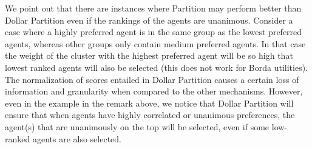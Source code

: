 \documentclass[letterpaper]{article}
\newtheorem{theorem}{Theorem}
\newcommand{\qed}{\unskip\hspace*{1em}\hspace{\fill}$\Box$}
\newenvironment{proof}[1][Proof]{\begin{trivlist}
 \item[\hskip \labelsep {\it #1:}]}{%
 \qed\end{trivlist}}
\DeclarePairedDelimiter{\ceil}{\lceil}{\rceil}
\DeclarePairedDelimiter{\floor}{\lfloor}{\rfloor}
\begin{document}
We point out that there are instances where Partition may perform better than Dollar Partition even if the rankings of the agents are unanimous. Consider a case where a highly preferred agent is in the same group as the lowest preferred agents, whereas other groups only contain medium preferred agents. In that case the weight of the cluster with the highest preferred agent will be so high that lowest ranked agents will also be selected (this does not work for Borda utilities).
The normalization of scores entailed in Dollar Partition causes a certain loss of information and granularity when compared to the other mechanisms.
However, even in the example in the remark above, we notice that Dollar Partition will ensure that when agents have highly correlated or unanimous preferences, the agent(s) that are unanimously on the top will be selected, even if some low-ranked agents are also selected.



%
%
\end{document}
